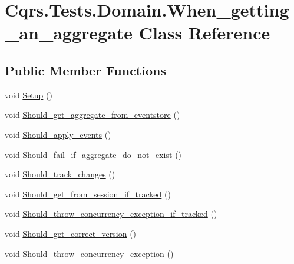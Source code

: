 \hypertarget{classCqrs_1_1Tests_1_1Domain_1_1When__getting__an__aggregate}{}\section{Cqrs.\+Tests.\+Domain.\+When\+\_\+getting\+\_\+an\+\_\+aggregate Class Reference}
\label{classCqrs_1_1Tests_1_1Domain_1_1When__getting__an__aggregate}
\subsection*{Public Member Functions}
\begin{DoxyCompactItemize}
\item 
void \hyperlink{classCqrs_1_1Tests_1_1Domain_1_1When__getting__an__aggregate_a17e6e5fee963f1be91d116e16f010fdb}{Setup} ()
\item 
void \hyperlink{classCqrs_1_1Tests_1_1Domain_1_1When__getting__an__aggregate_a8567c3c63d43386e34601e2f760fdea6}{Should\+\_\+get\+\_\+aggregate\+\_\+from\+\_\+eventstore} ()
\item 
void \hyperlink{classCqrs_1_1Tests_1_1Domain_1_1When__getting__an__aggregate_a7dac44c94e1139f61b9689d8ef57f924}{Should\+\_\+apply\+\_\+events} ()
\item 
void \hyperlink{classCqrs_1_1Tests_1_1Domain_1_1When__getting__an__aggregate_abffb22b1af3fdb7005cd27477aaa8b03}{Should\+\_\+fail\+\_\+if\+\_\+aggregate\+\_\+do\+\_\+not\+\_\+exist} ()
\item 
void \hyperlink{classCqrs_1_1Tests_1_1Domain_1_1When__getting__an__aggregate_a6dc0bedf2d67b0a6bc84afa023815464}{Should\+\_\+track\+\_\+changes} ()
\item 
void \hyperlink{classCqrs_1_1Tests_1_1Domain_1_1When__getting__an__aggregate_ab19bbe152359e6370a1395f71aea851b}{Should\+\_\+get\+\_\+from\+\_\+session\+\_\+if\+\_\+tracked} ()
\item 
void \hyperlink{classCqrs_1_1Tests_1_1Domain_1_1When__getting__an__aggregate_a82cc413f6fb26f7b47dc274dc01dbcf3}{Should\+\_\+throw\+\_\+concurrency\+\_\+exception\+\_\+if\+\_\+tracked} ()
\item 
void \hyperlink{classCqrs_1_1Tests_1_1Domain_1_1When__getting__an__aggregate_a6160a2d5764a545d0bbd1ad084fa3a4e}{Should\+\_\+get\+\_\+correct\+\_\+version} ()
\item 
void \hyperlink{classCqrs_1_1Tests_1_1Domain_1_1When__getting__an__aggregate_a855326fe351727f2aa5550de24f553ab}{Should\+\_\+throw\+\_\+concurrency\+\_\+exception} ()
\end{DoxyCompactItemize}


